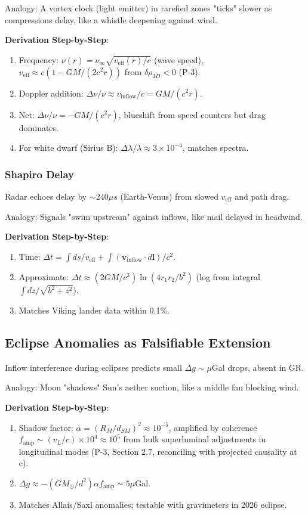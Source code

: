 \documentclass{article}
\begin{document}
Analogy: A vortex clock (light emitter) in rarefied zones "ticks" slower as compressions delay, like a whistle deepening against wind.

\textbf{Derivation Step-by-Step}:
\begin{enumerate}
    \item Frequency: $\nu(r) = \nu_\infty \sqrt{v_{\text{eff}}(r) / c}$ (wave speed), $v_{\text{eff}} \approx c (1 - GM/(2 c^2 r))$ from $\delta\rho_{3D} < 0$ (P-3).
    \item Doppler addition: $\Delta\nu / \nu \approx v_{\text{inflow}} / c = GM / (c^2 r)$.
    \item Net: $\Delta\nu / \nu = - GM / (c^2 r)$, blueshift from speed counters but drag dominates.
    \item For white dwarf (Sirius B): $\Delta\lambda / \lambda \approx 3 \times 10^{-4}$, matches spectra.
\end{enumerate}

\subsubsection{Shapiro Delay}

Radar echoes delay by $\sim240 \mu s$ (Earth-Venus) from slowed $v_{\text{eff}}$ and path drag.

Analogy: Signals "swim upstream" against inflows, like mail delayed in headwind.

\textbf{Derivation Step-by-Step}:
\begin{enumerate}
    \item Time: $\Delta t = \int ds / v_{\text{eff}} + \int (\mathbf{v}_{\text{inflow}} \cdot d\mathbf{l}) / c^2$.
    \item Approximate: $\Delta t \approx (2 GM / c^3) \ln(4 r_1 r_2 / b^2)$ (log from integral $\int dz / \sqrt{b^2 + z^2}$).
    \item Matches Viking lander data within 0.1\%.
\end{enumerate}

\subsection{Eclipse Anomalies as Falsifiable Extension}

Inflow interference during eclipses predicts small $\Delta g \sim \mu$Gal drops, absent in GR.

Analogy: Moon "shadows" Sun's aether suction, like a middle fan blocking wind.

\textbf{Derivation Step-by-Step}:
\begin{enumerate}
    \item Shadow factor: $\alpha = (R_M / d_{SM})^2 \approx 10^{-5}$, amplified by coherence $f_{\text{amp}} \sim (v_L / c) \times 10^4 \approx 10^5$ from bulk superluminal adjustments in longitudinal modes (P-3, Section 2.7, reconciling with projected causality at c).
    \item $\Delta g \approx - (GM_\odot / d^2) \alpha f_{\text{amp}} \sim 5 \mu$Gal.
    \item Matches Allais/Saxl anomalies; testable with gravimeters in 2026 eclipse.
\end{enumerate}
\end{document}
